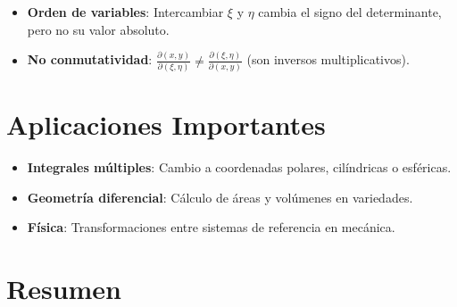 \documentclass{article}
\begin{document}
\begin{minipage}{\dimexpr\textwidth-2\fboxsep}
\begin{itemize}
\item \textbf{Orden de variables}: Intercambiar $\xi$ y $\eta$ cambia el signo del determinante, pero no su valor absoluto.
\item \textbf{No conmutatividad}: $\frac{\partial(x,y)}{\partial(\xi,\eta)} \neq \frac{\partial(\xi,\eta)}{\partial(x,y)}$ (son inversos multiplicativos).
\end{itemize}
\end{minipage}

\section{Aplicaciones Importantes}
\begin{minipage}{\dimexpr\textwidth-2\fboxsep}
\begin{itemize}
\item \textbf{Integrales múltiples}: Cambio a coordenadas polares, cilíndricas o esféricas.
\item \textbf{Geometría diferencial}: Cálculo de áreas y volúmenes en variedades.
\item \textbf{Física}: Transformaciones entre sistemas de referencia en mecánica.
\end{itemize}
\end{minipage}

\section{Resumen}

\begin{center}
\end{center}
\end{document}
